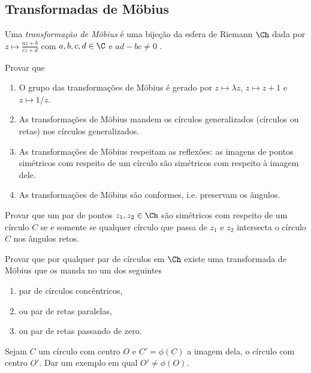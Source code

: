 \subsection{Transformadas de Möbius}

\begin{defin}
Uma \emph{transformação de Möbius} é uma bijeção da esfera de Riemann $\Ch$ dada por
$z\mapsto \frac{az+b}{cz+d}$ com $a,b,c,d\in\C$ e $ad - bc \neq 0$ .
\end{defin}

\begin{problema}
Provar que
\begin{enumerate}
\item O grupo das transformações de Möbius é gerado por $z\mapsto \lambda z$,
$z\mapsto z+1$ e $z\mapsto 1/z$.
\item As transformações de Möbius mandem os círculos generalizados (círculos ou retas)
nos círculos generalizados.
\item As transformações de Möbius respeitam as reflexões:
as imagens de pontos simétricos com respeito de um círculo são simétricos com respeito à imagem dele.
\item As transformações de Möbius são conformes, i.e. preservam os ângulos.
\end{enumerate}
\end{problema}

\begin{problema}
Provar que um par de pontos $z_1,z_2\in \Ch$ são simétricos com respeito de um círculo $C$
se e somente se qualquer círculo que passa de $z_1$ e $z_2$ intersecta o círculo $C$
nos ângulos retos.
\end{problema}

\begin{problema}
Provar que por qualquer par de círculos em $\Ch$ existe uma transformada de Möbius que os manda no
um dos seguintes
\begin{enumerate}
\item par de círculos concêntricos,
\item ou par de retas paralelas,
\item ou par de retas passando de zero.
\end{enumerate}
\end{problema}

\begin{problema}
Sejam $C$ um círculo com centro $O$ e $C' = \phi(C)$ a imagem dela,
o círculo com centro $O'$. Dar um exemplo em qual $O' \neq \phi(O)$.
\end{problema}

